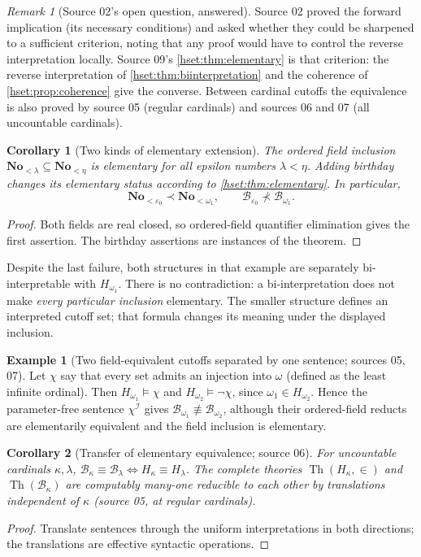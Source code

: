 \documentclass[11pt,letterpaper]{article}
\newtheorem{corollary}[corollary]{Corollary}\aliascntresetthe{corollary}
\theoremstyle{definition}
\newtheorem{example}[example]{Example}\aliascntresetthe{example}
\theoremstyle{remark}
\newtheorem{remark}[remark]{Remark}\aliascntresetthe{remark}
\newcommand{\No}{\mathbf{No}}
\newcommand{\B}{\mathcal B}
\newcommand{\I}{\mathcal I}
\begin{document}
\begin{remark}[Source 02's open question, answered]\label{hset:rem:answered-02}
Source 02 proved the forward implication (its necessary conditions) and asked
whether they could be sharpened to a sufficient criterion, noting that any
proof would have to control the reverse interpretation locally. Source 09's
\cref{hset:thm:elementary} is that criterion: the reverse interpretation of
\cref{hset:thm:biinterpretation} and the coherence of
\cref{hset:prop:coherence} give the converse. Between cardinal cutoffs the
equivalence is also proved by source 05 (regular cardinals) and sources 06 and
07 (all uncountable cardinals).
\end{remark}

\begin{corollary}[Two kinds of elementary extension]
The ordered field inclusion $\No_{<\lambda}\subseteq\No_{<\eta}$ is elementary
for all epsilon numbers $\lambda<\eta$. Adding birthday changes its elementary
status according to \cref{hset:thm:elementary}. In particular,
\[
 \No_{<\varepsilon_0}\prec\No_{<\omega_1},
 \qquad
 \B_{\varepsilon_0}\not\prec\B_{\omega_1}.
\]
\end{corollary}
\begin{proof}
Both fields are real closed, so ordered-field quantifier elimination gives
the first assertion. The birthday assertions are instances of the theorem.
\end{proof}

Despite the last failure, both structures in that example are separately
bi-interpretable with $H_{\omega_1}$. There is no contradiction: a
bi-interpretation does not make \emph{every particular inclusion} elementary.
The smaller structure defines an interpreted cutoff set; that formula changes
its meaning under the displayed inclusion.

\begin{example}[Two field-equivalent cutoffs separated by one sentence; sources 05, 07]
\label{hset:ex:omega12}
Let $\chi$ say that every set admits an injection into $\omega$ (defined as the
least infinite ordinal). Then $H_{\omega_1}\models\chi$ and
$H_{\omega_2}\models\neg\chi$, since $\omega_1\in H_{\omega_2}$. Hence the
parameter-free sentence $\chi^\I$ gives $\B_{\omega_1}\not\equiv\B_{\omega_2}$,
although their ordered-field reducts are elementarily equivalent and the
field inclusion is elementary.
\end{example}

\begin{corollary}[Transfer of elementary equivalence; source 06]\label{hset:cor:equiv}
For uncountable cardinals $\kappa,\lambda$,
$\B_\kappa\equiv\B_\lambda\iff H_\kappa\equiv H_\lambda$. The complete theories
$\operatorname{Th}(H_\kappa,\in)$ and $\operatorname{Th}(\B_\kappa)$ are
computably many-one reducible to each other by translations independent of
$\kappa$ (source 05, at regular cardinals).
\end{corollary}
\begin{proof}
Translate sentences through the uniform interpretations in both directions;
the translations are effective syntactic operations.
\end{proof}
\end{document}

